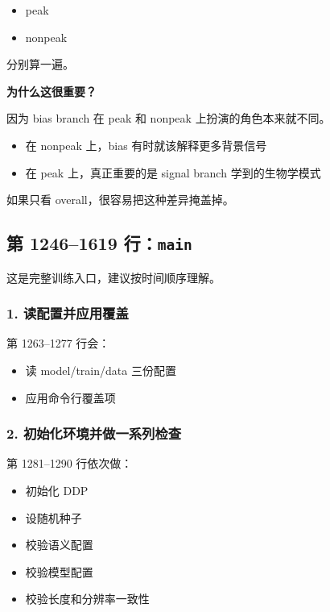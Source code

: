 \documentclass[11pt,a4paper]{ctexart}
\begin{document}
\begin{itemize}[leftmargin=2em]
\item peak
\item nonpeak
\end{itemize}

分别算一遍。

\textbf{为什么这很重要？}

因为 bias branch 在 peak 和 nonpeak 上扮演的角色本来就不同。

\begin{itemize}[leftmargin=2em]
\item 在 nonpeak 上，bias 有时就该解释更多背景信号
\item 在 peak 上，真正重要的是 signal branch 学到的生物学模式
\end{itemize}

如果只看 overall，很容易把这种差异掩盖掉。

\subsection{第 1246--1619 行：\texttt{main}}

这是完整训练入口，建议按时间顺序理解。

\subsubsection*{1. 读配置并应用覆盖}

第 1263--1277 行会：

\begin{itemize}[leftmargin=2em]
\item 读 model/train/data 三份配置
\item 应用命令行覆盖项
\end{itemize}

\subsubsection*{2. 初始化环境并做一系列检查}

第 1281--1290 行依次做：

\begin{itemize}[leftmargin=2em]
\item 初始化 DDP
\item 设随机种子
\item 校验语义配置
\item 校验模型配置
\item 校验长度和分辨率一致性
\end{itemize}
\end{document}
